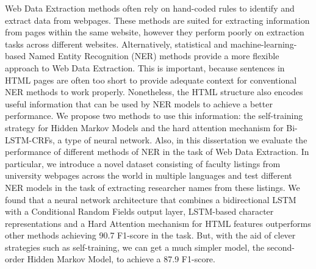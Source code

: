 Web Data Extraction methods often rely on hand-coded rules to 
identify and extract data from webpages. These methods are
suited for extracting information from pages within
the same website, however they perform poorly on extraction 
tasks across different websites. Alternatively, statistical and 
machine-learning-based Named Entity Recognition (NER) methods provide a more flexible 
approach to Web Data Extraction. This is important, 
because sentences in HTML pages are often too short to provide adequate 
context for conventional NER methods to work 
properly. Nonetheless, the HTML structure also encodes useful information that 
can be used by NER models to achieve a better performance. We propose two
methods to use this information: the self-training strategy for Hidden Markov
Models and the hard attention mechanism for Bi-LSTM-CRFs, a type of neural network.
Also, in this dissertation we 
evaluate the performance of different methods of NER
in the task of Web Data Extraction. In particular, we introduce a novel 
dataset consisting of faculty listings from university webpages across
the world in multiple languages and test different NER models in the task of 
extracting researcher names from these listings. We found that a 
neural network architecture that combines a bidirectional LSTM with
a Conditional Random Fields output layer, LSTM-based character 
representations and a Hard Attention mechanism for HTML features
outperforms other methods achieving 90.7 F1-score in the task.
But, with the aid of clever strategies such as self-training, we can get a 
much simpler model, the second-order Hidden Markov Model, 
to achieve a 87.9 F1-score.


